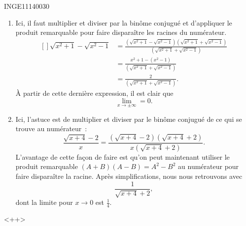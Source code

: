 \documentclass{article}
\begin{document}
\begin{corrige}{INGE11140030}

	\begin{enumerate}

		\item
			Ici, il faut multiplier et diviser par la binôme conjugué et d'appliquer le produit remarquable pour faire disparaître les racines du numérateur.
			\begin{equation}
				\begin{aligned}[]
					\sqrt{x^2+1}-\sqrt{x^2-1}	&=		\frac{ \left(\sqrt{x^2+1}-\sqrt{x^2-1}\right) \left(\sqrt{x^2+1}+\sqrt{x^2-1}\right)  }{  \left(\sqrt{x^2+1}+\sqrt{x^2-1}\right)  }\\
					&=\frac{ x^2+1-(x^2-1) }{  \left(\sqrt{x^2+1}+\sqrt{x^2-1}\right)  }\\
					&=\frac{ 2 }{  \left(\sqrt{x^2+1}+\sqrt{x^2-1}\right)  }.
				\end{aligned}
			\end{equation}
			À partir de cette dernière expression, il est clair que
			\begin{equation}
				\lim_{x\to \pm\infty} =0.
			\end{equation}

		\item
			Ici, l'astuce est de multiplier et diviser par le binôme conjugué de ce qui se trouve au numérateur~:
			\begin{equation}
				\frac{ \sqrt{x+4}-2 }{ x }= \frac{ \left( \sqrt{x+4}-2 \right)\left( \sqrt{x+4}+2 \right)}{ x\left( \sqrt{x+4}+2 \right) }.
			\end{equation}
			L'avantage de cette façon de faire est qu'on peut maintenant utiliser le produit remarquable $(A+B)(A-B)=A^2-B^2$ au numérateur pour faire disparaître la racine. Après simplifications, nous nous retrouvons  avec
			\begin{equation}
				\frac{1}{ \sqrt{x+4}+2 },
			\end{equation}
			dont la limite pour $x\to 0$ est $\frac{1}{ 4 }$.

	\end{enumerate}
	<++>

\end{corrige}
\end{document}

